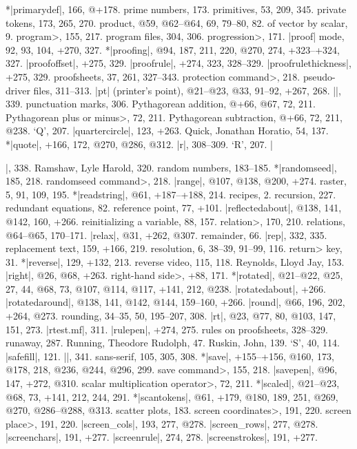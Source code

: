 *|primarydef|, 166, @+178.
prime numbers, 173.
primitives, 53, 209, 345.
private tokens, 173, 265, 270.
product, @59, @62--@64, 69, 79--80, 82.
\sub of vector by scalar, 9.
\<program>, 155, 217.
program files, 304, 306.
\<progression>, 171.
|proof| mode, 92, 93, 104, +270, 327.
*|proofing|, @94, 187, 211, 220, @270, 274, +323--+324, 327.
|proofoffset|, +275, 329.
|proofrule|, +274, 323, 328--329.
|proofrulethickness|, +275, 329.
proofsheets, 37, 261, 327--343.
\<protection command>, 218.
pseudo-driver files, 311--313.
|pt| (printer's point), @21--@23, @33, 91--92, +267, 268.
|\punct|, 339.
punctuation marks, 306.
Pythagorean addition, @+66, @67, 72, 211.
\<Pythagorean plus or minus>, 72, 211.
Pythagorean subtraction, @+66, 72, 211, @238.
\newletter
`Q', 207.
|quartercircle|, 123, +263.
Quick, Jonathan Horatio, 54, 137.
*|quote|, +166, 172, @270, @286, @312.
\newletter
|r|, 308--309.
`R', 207.
|\raggedright|, 338.
Ramshaw, Lyle Harold, 320.
random numbers, 183--185.
*|randomseed|, 185, 218.
\<randomseed command>, 218.
|range|, @107, @138, @200, +274.
raster, 5, 91, 109, 195.
*|readstring|, @61, +187--+188, 214.
recipes, 2.
recursion, 227.
redundant equations, 82.
reference point, 77, +101.
|reflectedabout|, @138, 141, @142, 160, +266.
reinitializing a variable, 88, 157.
\<relation>, 170, 210.
relations, @64--@65, 170--171.
|relax|, @31, +262, @307.
remainder, 66.
|rep|, 332, 335.
replacement text, 159, +166, 219.
resolution, 6, 38--39, 91--99, 116.
\<return> key, 31.
*|reverse|, 129, +132, 213.
reverse video, 115, 118.
Reynolds, Lloyd Jay, 153.
|right|, @26, @68, +263.
\<right-hand side>, +88, 171.
*|rotated|, @21--@22, @25, 27, 44, @68, 73, @107, @114, @117, +141, 212, @238.
|rotatedabout|, +266.
|rotatedaround|, @138, 141, @142, @144, 159--160, +266.
|round|, @66, 196, 202, +264, @273.
rounding, 34--35, 50, 195--207, 308.
|rt|, @23, @77, 80, @103, 147, 151, 273.
|rtest.mf|, 311.
|rulepen|, +274, 275.
rules on proofsheets, 328--329.
runaway, 287.
Running, Theodore Rudolph, 47.
Ruskin, John, 139.
\newletter
`S', 40, 114.
|safefill|, 121.
|\sample|, 341.
sans-serif, 105, 305, 308.
*|save|, +155--+156, @160, 173, @178, 218, @236, @244, @296, 299.
\<save command>, 155, 218.
|savepen|, @96, 147, +272, @310.
\<scalar multiplication operator>, 72, 211.
*|scaled|, @21--@23, @68, 73, +141, 212, 244, 291.
*|scantokens|, @61, +179, @180, 189, 251, @269, @270, @286--@288, @313.
scatter plots, 183.
\<screen coordinates>, 191, 220.
\<screen place>, 191, 220.
|screen_cols|, 193, 277, @278.
|screen_rows|, 277, @278.
|screenchars|, 191, +277.
|screenrule|, 274, 278.
|screenstrokes|, 191, +277.
